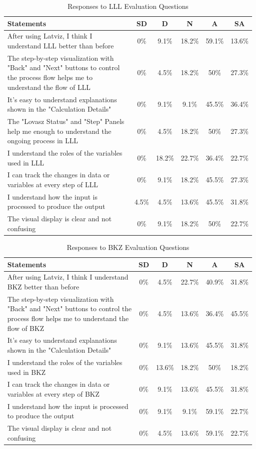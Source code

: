 \documentclass[runningheads]{llncs}
\begin{document}
\begin{table}[H]
\centering
\caption{Responses to LLL Evaluation Questions}
\label{tab:lllresults}
\begin{tabular}{|p{8cm}|c|c|c|c|c|}
\hline
Statements & SD & D & N & A & SA \\
\hline
After using Latviz, I think I understand LLL better than before & 0\% & 9.1\% & 18.2\% & 59.1\% & 13.6\% \\
\hline
The step-by-step visualization with "Back" and "Next" buttons to control the process flow helps me to understand the flow of LLL & 0\% & 4.5\% & 18.2\% & 50\% & 27.3\% \\
\hline
It's easy to understand explanations shown in the "Calculation Details" & 0\% & 9.1\% & 9.1\% & 45.5\% & 36.4\% \\
\hline
The "Lovasz Status" and "Step" Panels help me enough to understand the ongoing process in LLL & 0\% & 4.5\% & 18.2\% & 50\% & 27.3\% \\
\hline
I understand the roles of the variables used in LLL & 0\% & 18.2\% & 22.7\% & 36.4\% & 22.7\% \\
\hline
I can track the changes in data or variables at every step of LLL & 0\% & 9.1\% & 18.2\% & 45.5\% & 27.3\% \\
\hline
I understand how the input is processed to produce the output & 4.5\% & 4.5\% & 13.6\% & 45.5\% & 31.8\% \\
\hline
The visual display is clear and not confusing & 0\% & 9.1\% & 18.2\% & 50\% & 22.7\% \\
\hline
\end{tabular}
\end{table}
\begin{table}[H]
\centering
\caption{Responses to BKZ Evaluation Questions}
\label{tab:bkzresults}
\begin{tabular}{|p{8cm}|c|c|c|c|c|}
\hline
Statements & SD & D & N & A & SA \\
\hline
After using Latviz, I think I understand BKZ better than before & 0\% & 4.5\% & 22.7\% & 40.9\% & 31.8\% \\
\hline
The step-by-step visualization with "Back" and "Next" buttons to control the process flow helps me to understand the flow of BKZ & 0\% & 4.5\% & 13.6\% & 36.4\% & 45.5\% \\
\hline
It's easy to understand explanations shown in the "Calculation Details" & 0\% & 9.1\% & 13.6\% & 45.5\% & 31.8\% \\
\hline
I understand the roles of the variables used in BKZ & 0\% & 13.6\% & 18.2\% & 50\% & 18.2\% \\
\hline
I can track the changes in data or variables at every step of BKZ & 0\% & 9.1\% & 13.6\% & 45.5\% & 31.8\% \\
\hline
I understand how the input is processed to produce the output & 0\% & 9.1\% & 9.1\% & 59.1\% & 22.7\% \\
\hline
The visual display is clear and not confusing & 0\% & 4.5\% & 13.6\% & 59.1\% & 22.7\% \\
\hline
\end{tabular}
\end{table}
\FloatBarrier
\end{document}
